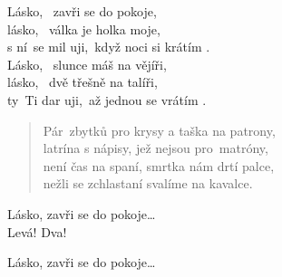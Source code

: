 \begin{song}{}
\begin{refren}
   Lásko, ~zavři se do pokoje, \\
   lásko, ~válka je holka moje, \\
   s ní~se mil uji,~když noci si krátím .   \\
   Lásko, ~slunce máš na vějíři, \\
   lásko, ~dvě třešně na talíři, \\
   ty~Ti dar uji,~až jednou se vrátím .  
\end{refren}
\begin{verse}
   Pár~zbytků pro krysy a taška na patrony, \\
   latrína s nápisy, jež nejsou pro~matróny, \\
   není čas na spaní, smrtka nám drtí palce, \\
   nežli se zchlastaní svalíme na kavalce.
\end{verse}
\begin{refren}
   Lásko, zavři se do pokoje\ldots \\
   Levá! Dva! 
\end{refren}
\begin{refren}
   Lásko, zavři se do pokoje\ldots
\end{refren}
\end{song}
\pagebreak
